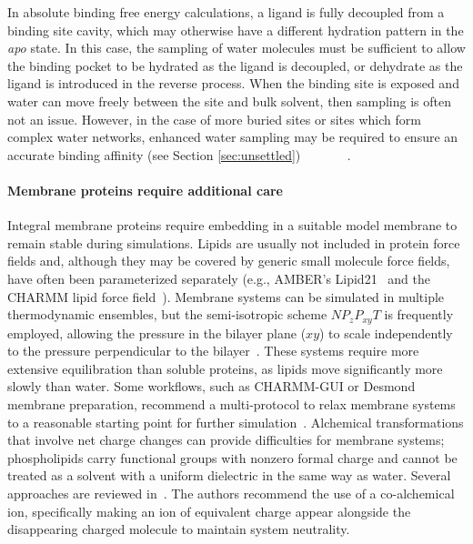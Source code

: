 \documentclass[9pt,bestpractices]{livecoms}
\begin{document}
In absolute binding free energy calculations, a ligand is fully decoupled from a binding site cavity, which may otherwise have a different hydration pattern in the \textit{apo} state. In this case, the sampling of water molecules must be sufficient to allow the binding pocket to be hydrated as the ligand is decoupled, or dehydrate as the ligand is introduced in the reverse process. When the binding site is exposed and water can move freely between the site and bulk solvent, then sampling is often not an issue. However, in the case of more buried sites or sites which form complex water networks, enhanced water sampling may be required to ensure an accurate binding affinity (see Section \ref{sec:unsettled})~\cite{NithishABFE}~\cite{baumann2021challenges} ~\cite{samways2020grand} ~\cite{ross2020enhancing}~\cite{BenShalom2020InterfacialWater}~\cite{ross2015water}. 


\paragraph{Membrane proteins require additional care}
Integral membrane proteins require embedding in a suitable model membrane to remain stable during simulations. Lipids are usually not included in protein force fields and, although they may be covered by generic small molecule force fields, have often been parameterized separately (e.g., AMBER's Lipid21~\cite{AMBERLipid21} and the CHARMM lipid force field~\cite{CHARMMLipidFF}). Membrane systems can be simulated in multiple thermodynamic ensembles, but the semi-isotropic scheme $NP_{z}P_{xy}T$ is frequently employed, allowing the pressure in the bilayer plane ($xy$) to scale independently to the pressure perpendicular to the bilayer~\cite{LipidBestPracticesCOMS}. These systems require more extensive equilibration than soluble proteins, as lipids move significantly more slowly than water. Some workflows, such as CHARMM-GUI or Desmond membrane preparation, recommend a multi-protocol to relax membrane systems to a reasonable starting point for further simulation~\cite{wu2014charmm-gui,DesmondManual}.  Alchemical transformations that involve net charge changes can provide difficulties for membrane systems; phospholipids carry functional groups with nonzero formal charge and cannot be treated as a solvent with a uniform dielectric in the same way as water. Several approaches are reviewed in~\cite{wu2022correction-51c}. The authors recommend the use of a co-alchemical ion, specifically making an ion of equivalent charge appear alongside the disappearing charged molecule to maintain system neutrality.
\end{document}
